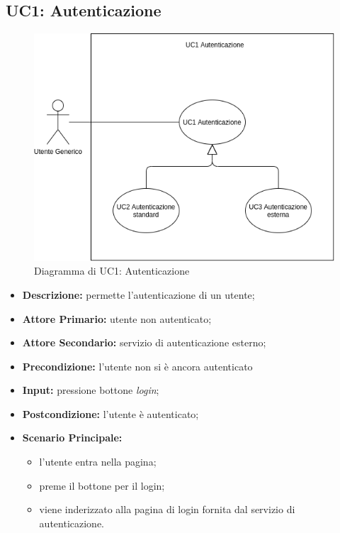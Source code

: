 \subsection{UC1: Autenticazione}
\label{sec:UC1}
\begin{figure}[!ht]
    \caption{Diagramma di UC1: Autenticazione}
    \vspace{10px}
    \includegraphics[scale=0.5]{../../../Images/AnalisiRequisiti/UC01}
    \centering
\end{figure}
\begin{itemize}
    \item \textbf{Descrizione:} permette l'autenticazione di un utente;
    \item \textbf{Attore Primario:} utente non autenticato;
    \item \textbf{Attore Secondario:} servizio di autenticazione esterno;
    \item \textbf{Precondizione:} l'utente non si è ancora autenticato
    \item \textbf{Input:} pressione bottone \textit{login};
    \item \textbf{Postcondizione:} l'utente è autenticato;
    \item \textbf{Scenario Principale:}
          \begin{itemize}
              \item l'utente entra nella pagina;
              \item preme il bottone per il login;
              \item viene inderizzato alla pagina di login fornita dal servizio di autenticazione.
          \end{itemize}
\end{itemize}
\newpage